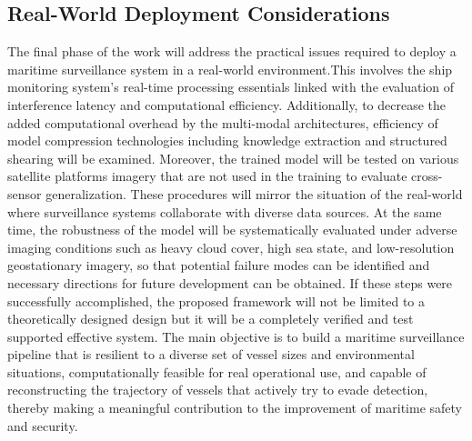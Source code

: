 \subsection{Real-World Deployment Considerations}
The final phase of the work will address the practical issues required to deploy a maritime surveillance system in a real-world environment.This involves the ship monitoring system’s real-time processing essentials linked with the evaluation of interference latency and computational efficiency. Additionally, to decrease the added computational overhead by the multi-modal architectures, efficiency of model compression technologies including knowledge extraction and structured shearing will be examined. Moreover, the trained model will be tested on various satellite platforms imagery that are not used in the training to evaluate cross-sensor generalization. These procedures will mirror the situation of the real-world where surveillance systems collaborate with diverse data sources. At the same time, the robustness of the model will be systematically evaluated under adverse imaging conditions such as heavy cloud cover, high sea state, and low-resolution geostationary imagery, so that potential failure modes can be identified and necessary directions for future development can be obtained. If these steps were successfully accomplished, the proposed framework will not be limited to a theoretically designed design but it will be a completely verified and test supported effective system. The main objective is to build a maritime surveillance pipeline that is resilient to a diverse set of vessel sizes and environmental situations, computationally feasible for real operational use, and capable of reconstructing the trajectory of vessels that actively try to evade detection, thereby making a meaningful contribution to the improvement of maritime safety and security. \\





